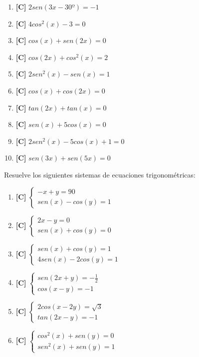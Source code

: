 \begin{enumerate}[topsep=0pt]
	\item \textbf{[C]} $ 2sen(3x-30º) = -1 $
	\item \textbf{[C]} $ 4 cos^2(x) -3 = 0$
	\item \textbf{[C]} $ cos(x) + sen(2x) = 0$
	\item \textbf{[C]} $ cos(2x) + cos^2(x) = 2$
	\item \textbf{[C]} $ 2 sen^2(x) - sen(x) = 1$
	\item \textbf{[C]} $ cos(x) + cos(2x) = 0$
	\item \textbf{[C]} $ tan(2x) + tan(x) = 0$
	\item \textbf{[C]} $ sen(x) + 5cos(x) = 0 $
	\item \textbf{[C]} $ 2 sen^2(x) - 5 cos(x) + 1 = 0 $
	\item \textbf{[C]} $ sen(3x) + sen(5x) = 0 $
\end{enumerate}


\Exercicio Resuelve los siguientes sistemas de ecuaciones trigonométricas:

\begin{enumerate}[topsep=0pt]
	\item \textbf{[C]} $ \begin{cases}
		-x + y = 90 \\
		sen(x) - cos(y)= 1
	\end{cases} $
	\item \textbf{[C]} $ \begin{cases}
		2x - y = 0 \\
		sen(x) + cos(y)= 0
	\end{cases} $
	\item \textbf{[C]} $ \begin{cases}
		sen(x) + cos(y) = 1 \\
		4 sen(x) - 2cos(y) = 1
	\end{cases} $
	\item \textbf{[C]} $ \begin{cases}
		sen(2x+y) = -\frac{1}{2} \\
		cos(x-y) = -1
	\end{cases} $
	\item \textbf{[C]} $ \begin{cases}
		2cos(x-2y) = \sqrt{3} \\
		tan(2x-y) = -1
	\end{cases} $
	\item \textbf{[C]} $ \begin{cases}
		cos^2(x) + sen(y) = 0 \\
		sen^2(x) + sen(y) = 1
	\end{cases} $
\end{enumerate}


